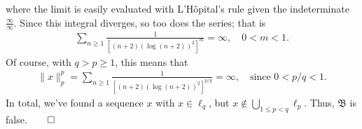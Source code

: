 \documentclass[10pt]{article}
\newcommand{\1}[1]{\mathbbm{1}_{#1}}
\begin{document}
    where the limit is easily evaluated with L'H\^opital's rule given the
    indeterminate $\tfrac{\infty}{\infty}$. Since this integral diverges, so too
    does the series; that is
    \begin{align*}
        \sum_{n\geq 1}\frac{1}{[(n+2)(\log(n+2))^2]^m}=\infty,\quad 0<m<1.
    \end{align*}
    Of course, with $q>p\geq 1$, this means that
    \begin{align*}
        \|x\|_p^p=\sum_{n\geq 1}\frac{1}{[(n+2)(\log(n+2))^2]^{p/q}}=\infty,\quad\text{since $0<p/q<1$.}
    \end{align*}
    In total, we've found a sequence $x$ with $x\in\ell_q$, but
    $x\notin\bigcup_{1\leq p<q}\ell_p$. Thus, $\mathfrak{B}$ is
    false.\hfill{$\qed$}
\end{document}
